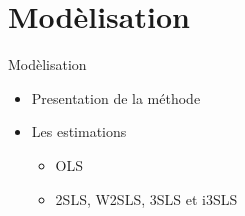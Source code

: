 \documentclass[11pt,ignorenonframetext,]{beamer}
\providecommand{\tightlist}{%
  \setlength{\itemsep}{0pt}\setlength{\parskip}{0pt}}
\begin{document}
\hypertarget{modelisation}{%
\section{Modèlisation}\label{modelisation}}

\begin{frame}{Modèlisation}
\protect\hypertarget{modelisation-1}{}

\begin{itemize}
\tightlist
\item
  Presentation de la méthode
\item
  Les estimations

  \begin{itemize}
  \tightlist
  \item
    OLS
  \item
    2SLS, W2SLS, 3SLS et i3SLS
  \end{itemize}
\end{itemize}

\end{frame}
\end{document}
